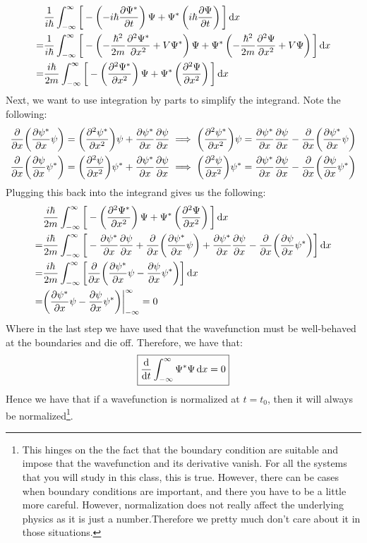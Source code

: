 \begin{align*}
    &
   \frac{1}{i\hbar} \int_{-\infty}^{\infty}\bigg[-\left(-i\hbar\pdv{\Psi^*}{t}\right)\Psi + \Psi^*\left(i\hbar\pdv{\Psi}{t}\right) \bigg]\dd{x} \\
   = & \frac{1}{i\hbar} \int_{-\infty}^{\infty}\bigg[-\left(-\dfrac{\hbar^2}{2m}\pdv[2]{\Psi^*}{x}+V\Psi^*\right)\Psi + \Psi^*\left(-\dfrac{\hbar^2}{2m}\pdv[2]{\Psi}{x}+V\Psi\right) \bigg]\dd{x} \\
   = & \frac{i\hbar}{2m} \int_{-\infty}^{\infty}\bigg[-\left(\pdv[2]{\Psi^*}{x}\right)\Psi + \Psi^*\left(\pdv[2]{\Psi}{x}\right) \bigg]\dd{x}
\end{align*}
Next, we want to use integration by parts to simplify the integrand. Note the following:
\begin{align*}
    \pdv{x}\bigg( \pdv{\psi^*}{x}\psi \bigg) & = \bigg(\pdv[2]{\psi^*}{x}\bigg)\psi + \pdv{\psi^*}{x} \pdv{\psi}{x} \implies \bigg(\pdv[2]{\psi^*}{x}\bigg)\psi = \pdv{\psi^*}{x} \pdv{\psi}{x} - \pdv{x}\bigg( \pdv{\psi^*}{x}\psi \bigg) \\
    \pdv{x}\bigg( \pdv{\psi}{x}\psi^* \bigg) & = \bigg(\pdv[2]{\psi}{x}\bigg)\psi^* + \pdv{\psi^*}{x} \pdv{\psi}{x} \implies \bigg(\pdv[2]{\psi}{x}\bigg)\psi^* = \pdv{\psi^*}{x} \pdv{\psi}{x} -  \pdv{x}\bigg( \pdv{\psi}{x}\psi^* \bigg)\\
\end{align*}
Plugging this back into the integrand gives us the following:
\begin{align*}
    & \frac{i\hbar}{2m} \int_{-\infty}^{\infty}\bigg[-\left(\pdv[2]{\Psi^*}{x}\right)\Psi + \Psi^*\left(\pdv[2]{\Psi}{x}\right) \bigg]\dd{x} \\
    = & \frac{i\hbar}{2m} \int_{-\infty}^{\infty}\bigg[ - \pdv{\psi^*}{x} \pdv{\psi}{x} + \pdv{x}\bigg( \pdv{\psi^*}{x}\psi \bigg) + \pdv{\psi^*}{x} \pdv{\psi}{x} -  \pdv{x}\bigg( \pdv{\psi}{x}\psi^*\bigg) \bigg]\dd{x} \\
    = & \frac{i\hbar}{2m} \int_{-\infty}^{\infty}\bigg[ \pdv{x}\bigg( \pdv{\psi^*}{x}\psi - \pdv{\psi}{x}\psi^*\bigg) \bigg]\dd{x} \\
    = & \bigg( \pdv{\psi^*}{x}\psi - \pdv{\psi}{x}\psi^*\bigg)\bigg|_{-\infty}^{\infty} = 0
\end{align*}
Where in the last step we have used that the wavefunction must be well-behaved at the boundaries and die off. Therefore, we have that:
\begin{equation*}
    \boxed{\dv{t}\int_{-\infty}^{\infty}\Psi^*\Psi\dd{x} = 0}
\end{equation*}
Hence we have that if a wavefunction is normalized at $t = t_{0}$, then it will always be normalized\footnote{This hinges on the the fact that the boundary condition are suitable and impose that the wavefunction and its derivative vanish. For all the systems that you will study in this class, this is true. However, there can be cases when boundary conditions are important, and there you have to be a little more careful. However, normalization does not really affect the underlying physics as it is just a number.Therefore we pretty much don't care about it in those situations.}. 

